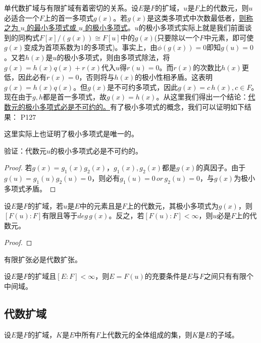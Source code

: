 \original
{
	单代数扩域与有限扩域有着密切的关系。设$E$是$F$的扩域，$u$是$F$上的代数元，则$u$必适合一个$F$上的首一多项式$g(x)$。若$g(x)$是这类多项式中次数最低者，\uline{则称之为 $u$ 的最小多项式或 $u$ 的极小多项式}。$u$的极小多项式实际上就是我们前面谈到的同构式$F[x]/(g(x))\cong F[u]$中的$g(x)$(只要除以一个$F$中元素，即可使$g(x)$变成为首项系数为1的多项式)。事实上，由$\phi(g(x))=0$即知$g(u)=0$。又若$h(x)$是$u$的极小多项式，则由多项式除法，将$g(x)=h(x)q(x)+r(x)$代入$u$得$r(u)=0$。而$r(x)$的次数比$h(x)$更低，因此必有$r(x)=0$，否则将与$h(x)$的极小性相矛盾。这表明$g(x)=h(x)q(x)$。但$g(x)$是不可约多项式，因此$g(x)=c\,h(x),c\in F$。现在由于$g,h$都是首一多项式，故$g(x)=h(x)$。从这里我们得出一个结论：\uline{代数元的极小多项式必是不可约的。}有了极小多项式的概念，我们可以证明如下结果：
}
{P127}
\begin{remark}
	这里实际上也证明了极小多项式是唯一的。
\end{remark}
\begin{proposition}
	验证：代数元$u$的极小多项式必是不可约的。
\end{proposition}

\begin{proof}
	若$g(x)=g_{1}(x)g_{2}(x)$，$g_{1}(x),g_{2}(x)$都是$g(x)$的真因子。由于$g(u)=g_{1}(u)g_{2}(u)=0$，则必有$g_{1}(u)=0\, or\, g_{2}(u)=0$，与$g(x)$为极小多项式矛盾。
\end{proof}


\begin{theorem}
	设$E$是$F$的扩域，若$u$是$E$中的元素且是$F$上的代数元，其极小多项式为$g(x)$，则$[F(u):F]$有限且等于$deg \, g(x)$。反之，若$[F(u):F]<\infty$，则$u$必是$F$上的代数元。
\end{theorem}
\begin{proof}
	
\end{proof}

\begin{corollary}
	有限扩张必是代数扩张。
\end{corollary}

\begin{theorem}[Steinitz定理]
	设$E$是$F$的扩域且$[E:F]<\infty$，则$E=F(u)$的充要条件是$E$与$F$之间只有有限个中间域。
\end{theorem}


\subsection{代数扩域}

\begin{theorem}\label{YMSthe040201}
	设$E$是$F$的扩域，$K$是$E$中所有$F$上代数元的全体组成的集，则$K$是$E$的子域。
\end{theorem}

